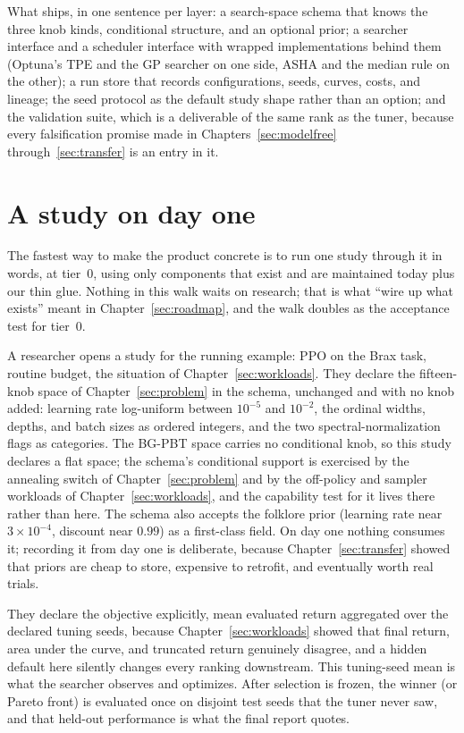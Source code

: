 What ships, in one sentence per layer: a search-space schema that
knows the three knob kinds, conditional structure, and an optional
prior; a searcher interface and a scheduler interface with wrapped
implementations behind them (Optuna's TPE and the GP searcher on one
side, ASHA and the median rule on the other); a run store that
records configurations, seeds, curves, costs, and lineage; the seed
protocol as the default study shape rather than an option; and the
validation suite, which is a deliverable of the same rank as the
tuner, because every falsification promise made in
Chapters~\ref{sec:modelfree} through~\ref{sec:transfer} is an entry
in it.

\section{A study on day one}

The fastest way to make the product concrete is to run one study
through it in words, at tier~0, using only components that exist and
are maintained today plus our thin glue. Nothing in this walk waits
on research; that is what ``wire up what exists'' meant in
Chapter~\ref{sec:roadmap}, and the walk doubles as the acceptance
test for tier~0.

A researcher opens a study for the running example: PPO on the Brax
task, routine budget, the situation of Chapter~\ref{sec:workloads}.
They declare the fifteen-knob space of Chapter~\ref{sec:problem} in the
schema, unchanged and with no knob added: learning rate log-uniform
between $10^{-5}$ and $10^{-2}$, the ordinal widths, depths, and batch
sizes as ordered integers, and the two spectral-normalization flags as
categories. The BG-PBT space carries no conditional knob, so this study
declares a flat space; the schema's conditional support is exercised by
the annealing switch of Chapter~\ref{sec:problem} and by the off-policy
and sampler workloads of Chapter~\ref{sec:workloads}, and the
capability test for it lives there rather than here. The schema also
accepts the folklore prior (learning rate
near $3 \times 10^{-4}$, discount near $0.99$) as a first-class
field. On day one nothing consumes it; recording it from day one is
deliberate, because Chapter~\ref{sec:transfer} showed that priors
are cheap to store, expensive to retrofit, and eventually worth
real trials.

They declare the objective explicitly, mean evaluated return aggregated
over the declared tuning seeds, because Chapter~\ref{sec:workloads}
showed that final return, area under the curve, and truncated return
genuinely disagree, and a hidden default here silently changes every
ranking downstream. This tuning-seed mean is what the searcher observes
and optimizes. After selection is frozen, the winner (or Pareto front)
is evaluated once on disjoint test seeds that the tuner never saw, and
that held-out performance is what the final report quotes.

